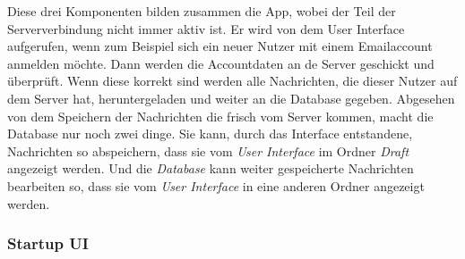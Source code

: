 \documentclass[a4paper,11pt]{article}
\begin{document}
\nohyphenation

Diese drei Komponenten bilden zusammen die App, wobei der Teil der Serververbindung nicht immer aktiv ist. Er wird von dem User Interface
aufgerufen, wenn zum Beispiel sich ein neuer Nutzer mit einem Emailaccount anmelden möchte. Dann werden die Accountdaten an de Server geschickt und überprüft.
Wenn diese korrekt sind werden alle Nachrichten, die dieser Nutzer auf dem Server hat, heruntergeladen und weiter an die Database gegeben. Abgesehen von dem 
Speichern der Nachrichten die frisch vom Server kommen, macht die Database nur noch zwei dinge. Sie kann, durch das Interface entstandene, Nachrichten so abspeichern, dass sie 
vom \textit{User Interface} im Ordner \textit{Draft} angezeigt werden. Und die \textit{Database} kann weiter gespeicherte Nachrichten bearbeiten so, dass sie vom 
\textit{User Interface} in eine anderen Ordner angezeigt werden.

\endgroup

\subsubsection{Startup UI}


\end{document}
